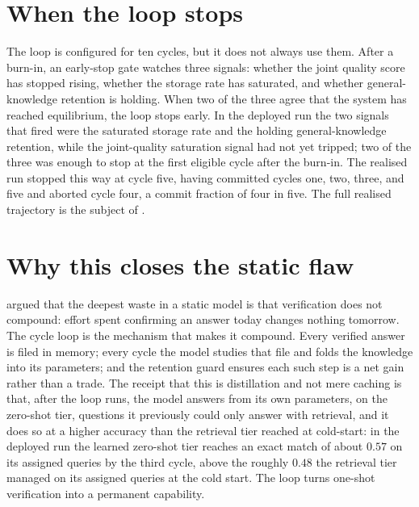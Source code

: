 \section{When the loop stops}
\label{sec:cycle-stop}

The loop is configured for ten cycles, but it does not always use them. After a burn-in,
an early-stop gate watches three signals: whether the joint quality score has stopped
rising, whether the storage rate has saturated, and whether general-knowledge retention is
holding. When two of the three agree that the system has reached equilibrium, the loop
stops early. In the deployed run the two signals that fired were the saturated storage
rate and the holding general-knowledge retention, while the joint-quality saturation
signal had not yet tripped; two of the three was enough to stop at the first eligible
cycle after the burn-in. The realised run stopped this way at cycle five, having committed
cycles one, two, three, and five and aborted cycle four, a commit fraction of four in
five. The full realised trajectory is the subject of .

\section{Why this closes the static flaw}
\label{sec:cycle-why}

\begin{intuition}
 argued that the deepest waste in a static model is that verification
does not compound: effort spent confirming an answer today changes nothing tomorrow. The
cycle loop is the mechanism that makes it compound. Every verified answer is filed in
memory; every cycle the model studies that file and folds the knowledge into its
parameters; and the retention guard ensures each such step is a net gain rather than a
trade. The receipt that this is distillation and not mere caching is that, after the loop
runs, the model answers from its own parameters, on the zero-shot tier, questions it
previously could only answer with retrieval, and it does so at a higher accuracy than the
retrieval tier reached at cold-start: in the deployed run the learned zero-shot tier
reaches an exact match of about $0.57$ on its assigned queries by the third cycle, above
the roughly $0.48$ the retrieval tier managed on its assigned queries at the cold start.
The loop turns one-shot verification into a permanent capability.
\end{intuition}

